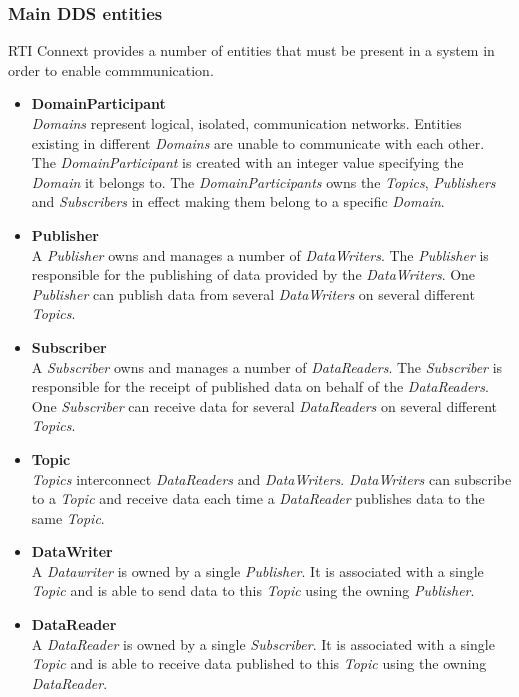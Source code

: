 \subsubsection{Main DDS entities}
RTI Connext provides a number of entities that must be present in a system in order to enable commmunication.

\begin{itemize}
	\item \textbf{DomainParticipant} \\
		\textit{Domains} represent logical, isolated, communication networks. Entities existing in different \textit{Domains} are unable to communicate with each other. The \textit{DomainParticipant} is created with an integer value specifying the \textit{Domain} it belongs to. The \textit{DomainParticipants} owns the \textit{Topics}, \textit{Publishers} and \textit{Subscribers} in effect making them belong to a specific \textit{Domain}.
	
	\item \textbf{Publisher} \\
		A \textit{Publisher} owns and manages a number of \textit{DataWriters}. The \textit{Publisher} is responsible for the publishing of data provided by the \textit{DataWriters}. One \textit{Publisher} can publish data from several \textit{DataWriters} on several different \textit{Topics}.
	
	\item \textbf{Subscriber} \\
		A \textit{Subscriber} owns and manages a number of \textit{DataReaders}. The \textit{Subscriber} is responsible for the receipt of published data on behalf of the \textit{DataReaders}. One \textit{Subscriber} can receive data for several \textit{DataReaders} on several different \textit{Topics}. 
	
	\item \textbf{Topic} \\
		\textit{Topics} interconnect \textit{DataReaders} and \textit{DataWriters}. \textit{DataWriters} can subscribe to a \textit{Topic} and receive data each time a \textit{DataReader} publishes data to the same \textit{Topic}.
	
	\item \textbf{DataWriter} \\
		A \textit{Datawriter} is owned by a single \textit{Publisher}. It is associated with a single \textit{Topic} and is able to send data to this \textit{Topic} using the owning \textit{Publisher}.
	
	\item \textbf{DataReader} \\
		A \textit{DataReader} is owned by a single \textit{Subscriber}. It is associated with a single \textit{Topic} and is able to receive data published to this \textit{Topic} using the owning \textit{DataReader}.
\end{itemize}

